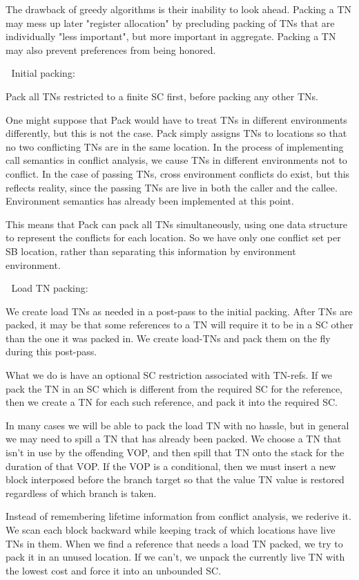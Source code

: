 The drawback of greedy algorithms is their inability to look ahead.  Packing a
TN may mess up later "register allocation" by precluding packing of TNs that
are individually "less important", but more important in aggregate.  Packing a
TN may also prevent preferences from being honored.



Initial packing:


Pack all TNs restricted to a finite SC first, before packing any other TNs.

One might suppose that Pack would have to treat TNs in different environments
differently, but this is not the case.  Pack simply assigns TNs to locations so
that no two conflicting TNs are in the same location.  In the process of
implementing call semantics in conflict analysis, we cause TNs in different
environments not to conflict.  In the case of passing TNs, cross environment
conflicts do exist, but this reflects reality, since the passing TNs are
live in both the caller and the callee.  Environment semantics has already been
implemented at this point.

This means that Pack can pack all TNs simultaneously, using one data structure
to represent the conflicts for each location.  So we have only one conflict set
per SB location, rather than separating this information by environment
environment.


Load TN packing:

We create load TNs as needed in a post-pass to the initial packing.  After TNs
are packed, it may be that some references to a TN will require it to be in a
SC other than the one it was packed in.  We create load-TNs and pack them on
the fly during this post-pass.  

What we do is have an optional SC restriction associated with TN-refs.  If we
pack the TN in an SC which is different from the required SC for the reference,
then we create a TN for each such reference, and pack it into the required SC.

In many cases we will be able to pack the load TN with no hassle, but in
general we may need to spill a TN that has already been packed.  We choose a
TN that isn't in use by the offending VOP, and then spill that TN onto the
stack for the duration of that VOP.  If the VOP is a conditional, then we must
insert a new block interposed before the branch target so that the value TN
value is restored regardless of which branch is taken.

Instead of remembering lifetime information from conflict analysis, we rederive
it.  We scan each block backward while keeping track of which locations have
live TNs in them.  When we find a reference that needs a load TN packed, we try
to pack it in an unused location.  If we can't, we unpack the currently live TN
with the lowest cost and force it into an unbounded SC.

